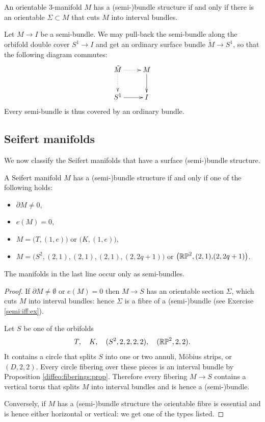 \begin{ex} \label{semi:iff:ex}
An orientable 3-manifold $M$ has a (semi-)bundle structure if and only if there is an orientable $\Sigma \subset M$ that cuts $M$ into interval bundles.
\end{ex}

Let $M\to I$ be a semi-bundle. We may pull-back the semi-bundle along the orbifold double cover $S^1 \to I$ and get an ordinary surface bundle $\tilde M \to S^1$, so that the following diagram commutes:
$$
\xymatrix{ 
\tilde M\ar@{.>}[r] \ar@{.>}[d] & M \ar[d] \\
S^1\ar[r] & I
}
$$
Every semi-bundle is thus covered by an ordinary bundle.

\subsection{Seifert manifolds} \label{Seifert:fibers:subsection}
We now classify the Seifert manifolds that have a surface (semi-)bundle structure.

\begin{prop} \label{Seifert:bundle:prop}
A Seifert manifold $M$ has a (semi-)bundle structure if and only if one of the following holds: 
\begin{itemize}
\item $\partial M \neq 0$, 
\item $e(M)=0$, 
\item $M = \big(T,(1,e)\big)$ or $\big(K,(1,e)\big)$,
\item $M = \big(S^2, (2,1),\! (2,1),\! (2,1),\! (2,2q+1)\big)$ or $\big(\mathbb{RP}^2, (2,1),\! (2,2q+1)\big)$.
\end{itemize}
The manifolds in the last line occur only as semi-bundles.
\end{prop}
\begin{proof}
If $\partial M \neq \emptyset$ or $e(M)=0$ then $M\to S$ has an orientable section $\Sigma$, which cuts $M$ into interval bundles: hence $\Sigma$ is a fibre of a (semi-)bundle (see Exercise \ref{semi:iff:ex}).

Let $S$ be one of the orbifolds
$$T, \quad K, \quad (S^2,2,2,2,2), \quad (\mathbb{RP}^2, 2,2).$$
It contains a circle that splits $S$ into one or two annuli, M\"obius strips, or $(D,2,2)$. 
Every circle fibering over these pieces is an interval bundle by Proposition \ref{diffeo:fiberings:prop}. Therefore every fibering $M \to S$ contains a vertical torus that splits $M$ into interval bundles and is hence a (semi-)bundle.

Conversely, if $M$ has a (semi-)bundle structure the orientable fibre is essential and is hence either horizontal or vertical: we get one of the types listed.
\end{proof}

